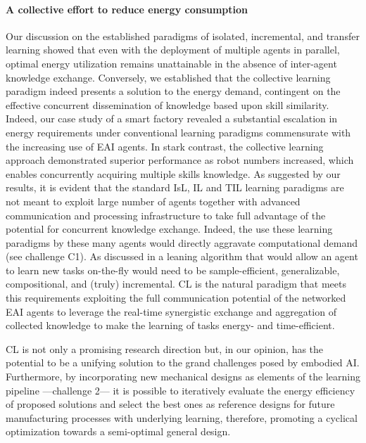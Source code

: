 \documentclass[12pt]{article}
\begin{document}
\paragraph*{A collective effort to reduce energy consumption}
Our discussion on the established paradigms of isolated, incremental, and transfer learning showed that even with the deployment of multiple agents in parallel, optimal energy utilization remains unattainable in the absence of inter-agent knowledge exchange. Conversely, we established that the collective learning paradigm indeed presents a solution to the energy demand, contingent on the effective concurrent dissemination of knowledge based upon skill similarity. Indeed, our case study of a smart factory revealed a substantial escalation in energy requirements under conventional learning paradigms commensurate with the increasing use of EAI agents. In stark contrast, the collective learning approach demonstrated superior performance as robot numbers increased, which enables concurrently acquiring multiple skills knowledge.
As suggested by our results, it is evident that the standard IsL, IL and TIL learning paradigms are not meant to exploit large number of agents together with advanced communication and processing infrastructure to take full advantage of the potential for concurrent knowledge exchange. Indeed, the use these learning paradigms by these many agents would directly aggravate computational demand (see challenge C1). As discussed in \cite{Kaelbling2020foundationefficientrobot} a leaning algorithm that would allow an agent to learn new tasks on-the-fly would need to be sample-efficient, generalizable, compositional, and (truly) incremental. CL is the natural paradigm that meets this requirements exploiting the full communication potential of the networked EAI agents to leverage the real-time synergistic exchange and aggregation of collected knowledge to make the learning of tasks energy- and time-efficient. 

CL is not only a promising research direction but, in our opinion, has the potential to be a unifying solution to the grand challenges posed by embodied AI. Furthermore, by incorporating new mechanical designs as elements of the learning pipeline ---challenge 2--- it is possible to iteratively evaluate the energy efficiency of proposed solutions and select the best ones as reference designs for future manufacturing processes with underlying learning, therefore, promoting a cyclical optimization towards a semi-optimal general design.

\end{document}
